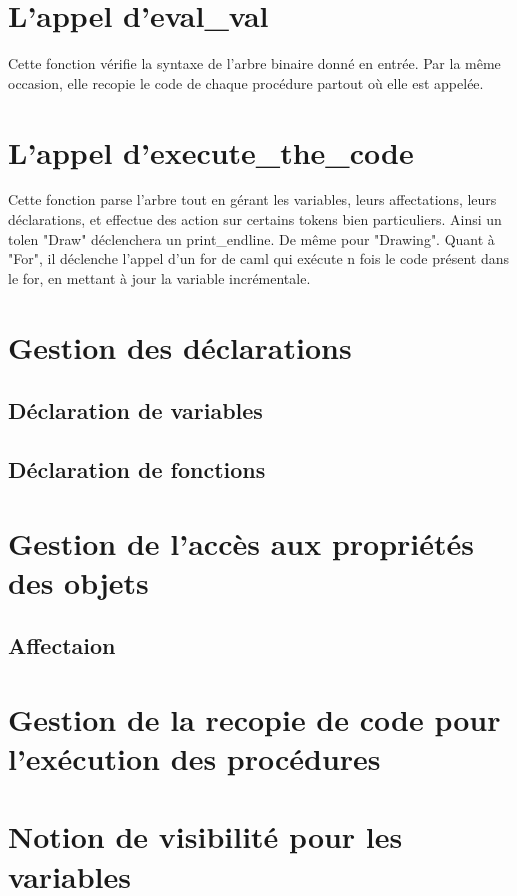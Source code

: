 \documentclass[11pt]{report} %
\begin{document}
\section{L'appel d'eval\_val}
Cette fonction vérifie la syntaxe de l'arbre binaire donné en entrée. Par la même occasion, elle recopie le code de chaque procédure partout où elle est appelée.

\section{L'appel d'execute\_the\_code}
Cette fonction parse l'arbre tout en gérant les variables, leurs affectations, leurs déclarations, et effectue des action sur certains tokens bien particuliers. Ainsi un tolen "Draw" déclenchera un print\_endline. De même pour "Drawing". Quant à "For", il déclenche l'appel d'un for de caml qui exécute n fois le code présent dans le for, en mettant à jour la variable incrémentale.

\section{Gestion des déclarations}
\subsection{Déclaration de variables}
\subsection{Déclaration de fonctions}



\section{Gestion de l'accès aux propriétés des objets}%
\subsection{Affectaion}


\section{Gestion de la recopie de code pour l'exécution des procédures}

\section{Notion de visibilité pour les variables}
\end{document}

